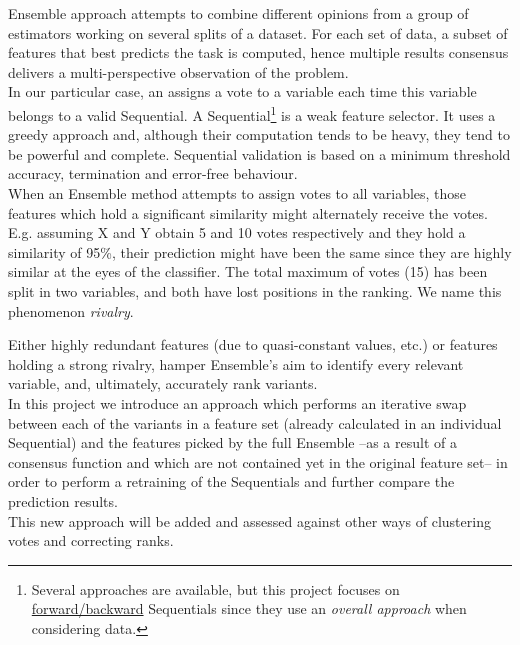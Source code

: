 Ensemble approach attempts to combine different opinions from a group of estimators working on several splits of a dataset. For each set of data, a subset of features that best predicts the task is computed, hence multiple results consensus delivers a multi-perspective observation of the problem. 
\\

In our particular case, an  assigns a vote to a variable each time this variable belongs to a valid Sequential. A Sequential\footnote{Several approaches are available, but this project focuses on \href{http://rasbt.github.io/mlxtend/user_guide/feature_selection/SequentialFeatureSelector/}{forward/backward} Sequentials since they use an \emph{overall approach} when considering data.} is a weak feature selector. It uses a greedy approach and, although their computation tends to be heavy, they tend to be powerful and complete. Sequential validation is based on a minimum threshold accuracy, termination and error-free behaviour.
\\

When an Ensemble method attempts to assign votes to all variables, those features which hold a significant similarity might alternately receive the votes. E.g. assuming X and Y obtain 5 and 10 votes respectively and they hold a similarity of 95\%, their prediction might have been the same since they are highly similar at the eyes of the classifier. The total maximum of votes (15) has been split in two variables, and both have lost positions in the ranking. We name this phenomenon \emph{rivalry}.

Either highly redundant features (due to quasi-constant values, etc.) or features holding a strong rivalry, hamper Ensemble's aim to identify every relevant variable, and, ultimately, accurately rank variants.
\\

In this project we introduce an approach which performs an iterative swap between each of the variants in a feature set (already calculated in an individual Sequential) and the features picked by the full Ensemble --as a result of a consensus function and which are not contained yet in the original feature set-- in order to perform a retraining of the Sequentials and further compare the prediction results.
\\

This new approach will be added and assessed against other ways of clustering votes and correcting ranks.
\\

